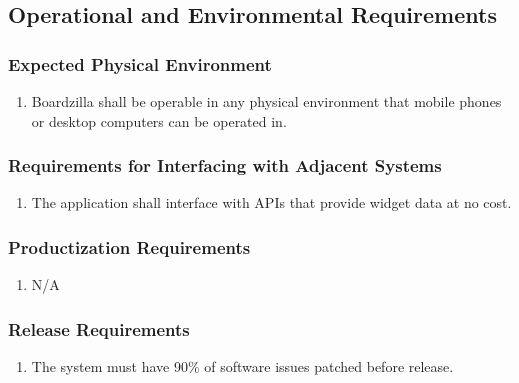 \documentclass[]{article}
\begin{document}
	
	\subsection{Operational and Environmental Requirements}
	\label{sub:operational_and_environmental_requirements}
	
	\subsubsection{Expected Physical Environment}
	\label{ssub:expected_physical_environment}
	\begin{enumerate}[{OE}1. ]
		\item Boardzilla shall be operable in any physical environment that mobile phones or desktop computers can be operated in.
	\end{enumerate}
	
	\subsubsection{Requirements for Interfacing with Adjacent Systems}
	\label{ssub:requirements_for_interfacing_with_adjacent_systems}
	\begin{enumerate}[{OE}1. ]
		\item The application shall interface with APIs that provide widget data at no cost.
	\end{enumerate}
	
	\subsubsection{Productization Requirements}
	\label{ssub:productization_requirements}
	\begin{enumerate}[{OE}1. ]
		\item N/A
	\end{enumerate}
	
	\subsubsection{Release Requirements}
	\label{ssub:release_requirements}
	\begin{enumerate}[{OE}1. ]
		\item The system must have 90\% of software issues patched before release.
	\end{enumerate}
	
\end{document}
